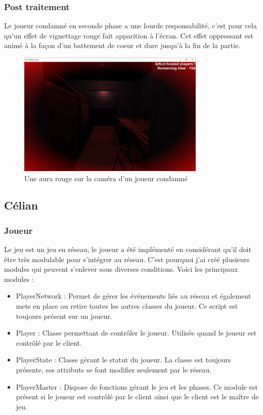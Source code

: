 \documentclass{article}
\begin{document}
\subsubsection{Post traitement}

Le joueur condamné en seconde phase a une lourde responsabilité, c'est pour cela qu'un effet de vignettage rouge fait apparition à l'écran.
Cet effet oppressant est animé à la façon d'un battement de coeur et dure jusqu'à la fin de la partie.

\begin{figure}[H]
    \centering
    \includegraphics[width=0.8\textwidth]{cc/post_proc.png}
    \caption{Une aura rouge sur la caméra d'un joueur condamné}
    \label{cc_d}
\end{figure}

\newpage
\subsection{Célian}
\subsubsection{Joueur}

Le jeu est un jeu en réseau, le joueur a été implémenté en considérant qu'il doit être très modulable pour s'intégrer au réseau.
C'est pourquoi j'ai créé plusieurs modules qui peuvent s'enlever sous diverses conditions.
Voici les principaux modules :

\begin{itemize}
	\item  PlayerNetwork : Permet de gérer les événements liés au réseau et également
mets en place ou retire toutes les autres classes du joueur. Ce script est
toujours présent sur un joueur.
	\item  Player : Classe permettant de contrôler le joueur. Utilisée quand le joueur
est contrôlé par le client.
	\item  PlayerState : Classe gérant le statut du joueur. La classe est toujours
présente, ses attributs se font modifier seulement par le réseau.
	\item PlayerMaster : Dispose de fonctions gérant le jeu et les phases. Ce module
est présent si le joueur est contrôlé par le client ainsi que le client est le
maître de jeu.
\end{itemize}
\end{document}

